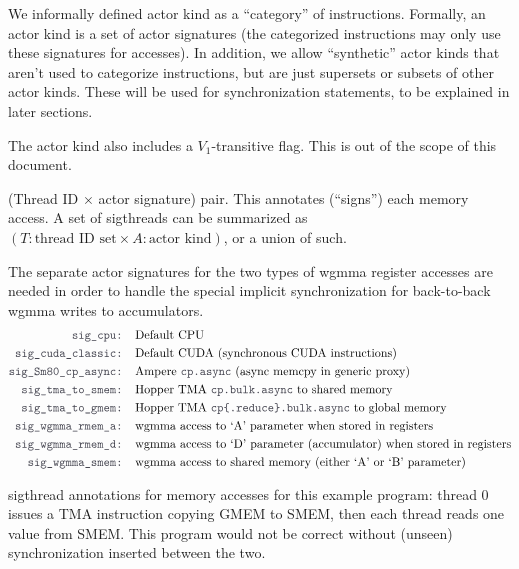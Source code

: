 \filbreak
{} We informally defined actor kind as a ``category'' of instructions.
Formally, an actor kind is a set of actor signatures (the categorized instructions may only use these signatures for accesses).
In addition, we allow ``synthetic'' actor kinds that aren't used to categorize instructions, but are just supersets or subsets of other actor kinds.
These will be used for synchronization statements, to be explained in later sections.

\filbreak
The actor kind also includes a $V_1$-transitive flag.
This is out of the scope of this document.

\filbreak
{} (Thread ID $\times$ actor signature) pair.
This annotates (``signs'') each memory access.
A set of sigthreads can be summarized as $(T:\text{thread ID set} \times A:\text{actor kind})$, or a union of such.

\filbreak
{} The separate actor signatures for the two types of wgmma register accesses are needed in order to handle the special implicit synchronization for back-to-back wgmma writes to accumulators.
\begin{align*}
\lighttt{sig\_cpu: } & \text{Default CPU}\\
\lighttt{sig\_cuda\_classic: } & \text{Default CUDA (synchronous CUDA instructions)}\\
\lighttt{sig\_Sm80\_cp\_async: } & \text{Ampere \lighttt{cp.async} (async memcpy in generic proxy)}\\
\lighttt{sig\_tma\_to\_smem: } & \text{Hopper TMA \lighttt{cp.bulk.async} to shared memory}\\
\lighttt{sig\_tma\_to\_gmem: } & \text{Hopper TMA \lighttt{cp\{.reduce\}.bulk.async} to global memory}\\
\lighttt{sig\_wgmma\_rmem\_a: } & \text{wgmma access to `A' parameter when stored in registers}\\
\lighttt{sig\_wgmma\_rmem\_d: } & \text{wgmma access to `D' parameter (accumulator) when stored in registers}\\
\lighttt{sig\_wgmma\_smem: } & \text{wgmma access to shared memory (either `A' or `B' parameter)}
\end{align*}

\filbreak
{} sigthread annotations for memory accesses for this example program: thread 0 issues a TMA instruction copying \textsf{GMEM} to \textsf{SMEM}, then each thread reads one value from \textsf{SMEM}.
This program would not be correct without (unseen) synchronization inserted between the two.

